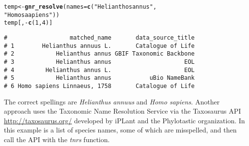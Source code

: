 \documentclass[10pt,a4paper,twocolumn]{article}\usepackage[]{graphicx}\usepackage[]{color}
\makeatletter
\newcommand{\hlnum}[1]{\textcolor[rgb]{0.686,0.059,0.569}{#1}}%
\newcommand{\hlstr}[1]{\textcolor[rgb]{0.192,0.494,0.8}{#1}}%
\newcommand{\hlopt}[1]{\textcolor[rgb]{0,0,0}{#1}}%
\newcommand{\hlstd}[1]{\textcolor[rgb]{0.345,0.345,0.345}{#1}}%
\newcommand{\hlkwb}[1]{\textcolor[rgb]{0.69,0.353,0.396}{#1}}%
\newcommand{\hlkwc}[1]{\textcolor[rgb]{0.333,0.667,0.333}{#1}}%
\newcommand{\hlkwd}[1]{\textcolor[rgb]{0.737,0.353,0.396}{\textbf{#1}}}%
\newenvironment{kframe}{%
 \def\at@end@of@kframe{}%
 \ifinner\ifhmode%
  \def\at@end@of@kframe{\end{minipage}}%
  \begin{minipage}{\columnwidth}%
 \fi\fi%
 \def\FrameCommand##1{\hskip\@totalleftmargin \hskip-\fboxsep
 \colorbox{shadecolor}{##1}\hskip-\fboxsep
     \hskip-\linewidth \hskip-\@totalleftmargin \hskip\columnwidth}%
 \MakeFramed {\advance\hsize-\width
   \@totalleftmargin\z@ \linewidth\hsize
   \@setminipage}}%
 {\par\unskip\endMakeFramed%
 \at@end@of@kframe}
\newenvironment{knitrout}{}{} %
\makeatother
\begin{document}
\begin{knitrout}\scriptsize
{}\color{fgcolor}\begin{kframe}
\begin{alltt}
\hlstd{temp} \hlkwb{<-} \hlkwd{gnr_resolve}\hlstd{(}\hlkwc{names} \hlstd{=} \hlkwd{c}\hlstd{(}\hlstr{"Helianthos annus"}\hlstd{,}
                              \hlstr{"Homo saapiens"}\hlstd{))}
\hlstd{temp[ ,} \hlopt{-}\hlkwd{c}\hlstd{(}\hlnum{1}\hlstd{,}\hlnum{4}\hlstd{)]}
\end{alltt}
\begin{verbatim}
#                  matched_name       data_source_title
# 1        Helianthus annuus L.       Catalogue of Life
# 2            Helianthus annus GBIF Taxonomic Backbone
# 3            Helianthus annus                     EOL
# 4         Helianthus annus L.                     EOL
# 5            Helianthus annus           uBio NameBank
# 6 Homo sapiens Linnaeus, 1758       Catalogue of Life
\end{verbatim}
\end{kframe}
\end{knitrout}



The correct spellings are \emph{Helianthus annuus} and \emph{Homo sapiens}. Another approach uses the Taxonomic Name Resolution Service via the Taxosaurus API \url{http://taxosaurus.org/} developed by iPLant and the Phylotastic organization. In this example is a list of species names, some of which are misspelled, and then call the API with the \emph{tnrs} function.
\end{document}
